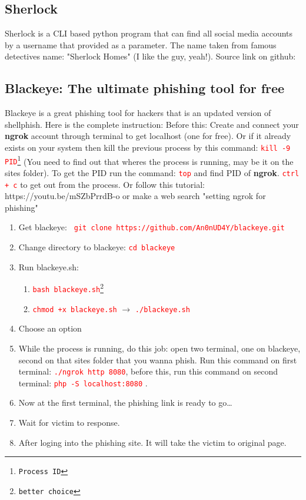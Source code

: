 \documentclass[12 pt, letterpaper]{extarticle}
\newcommand{\R}{\textcolor{red}} %
\newcommand{\T}{\texttt}
\begin{document}
\subsection*{Sherlock}
Sherlock is a CLI based python program that can find all social media accounts by a username that provided as a parameter. The name taken from famous detectives name: "Sherlock Homes" (I like the guy, yeah!). Source link on github: %

\subsection*{Blackeye: The ultimate phishing tool for free} %
Blackeye is a great phishing tool for hackers that is an updated version of shellphish. Here is the complete instruction:
Before this: Create and connect your \textbf{ngrok} account through terminal to get localhost (one for free). Or if it already exists on your system then kill the previous process by this command: \R{\T{kill -9 {PID\footnote{Process ID}}}} (You need to find out that wheres the process is running, may be it on the sites folder). To get the PID run the command: \R{\T{top}} and find PID of \textbf{ngrok}. \R{\T{ctrl + c}} to get out from the process. Or follow this tutorial: {https://youtu.be/mSZbPrrdB-o} or make a web search "setting ngrok for phishing"
\begin{enumerate}
	\item Get blackeye:  \R{\T{ git clone https://github.com/An0nUD4Y/blackeye.git}}
	\item Change directory to blackeye: \R{\T{cd blackeye}}
	\item Run blackeye.sh:
	      \begin{enumerate}
		      \item \R{\T{bash blackeye.sh\footnote{better choice}}}
		      \item \R{\T{chmod +x blackeye.sh}} $\rightarrow$ \R{\T{./blackeye.sh}}
	      \end{enumerate}
	\item Choose an option
	\item While the process is running, do this job: open two terminal, one on blackeye, second on that sites folder that you wanna phish. Run this command on first terminal: \R{\T{./ngrok http 8080}}, before this, run this command on second terminal: \R{\T{php -S localhost:8080}} .
	\item Now at the first terminal, the phishing link is ready to go\dots
	\item Wait for victim to response.
	\item After loging into the phishing site. It will take the victim to original page.
\end{enumerate}
\end{document}
